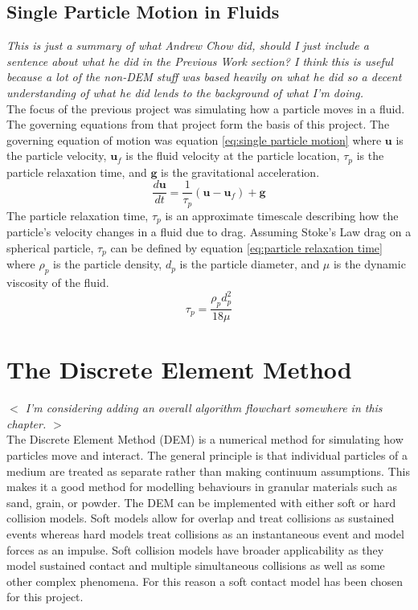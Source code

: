 \documentclass[10pt,a4paper,titlepage]{report}
\begin{document}
\section{Single Particle Motion in Fluids}
\label{sec:Single Particle Motion in Fluids}
\textit{This is just a summary of what Andrew Chow did, should I just include a sentence about what he did in the Previous Work section? I think this is useful because a lot of the non-DEM stuff was based heavily on what he did so a decent understanding of what he did lends to the background of what I'm doing.\\}
The focus of the previous project was simulating how a particle moves in a fluid. The governing equations from that project form the basis of this project. The governing equation of motion was equation \ref{eq:single particle motion} where $\mathbf{u}$ is the particle velocity, $\mathbf{u}_f$ is the fluid velocity at the particle location, $\tau_p$ is the particle relaxation time, and $\mathbf{g}$ is the gravitational acceleration.
\begin{equation}
\label{eq:single particle motion}
\dfrac{d\mathbf{u}}{dt} = \dfrac{1}{\tau_p}(\mathbf{u} - \mathbf{u}_f) + \mathbf{g}
\end{equation}
The particle relaxation time, $\tau_p$ is an approximate timescale describing how the particle's velocity changes in a fluid due to drag. Assuming Stoke's Law drag on a spherical particle, $\tau_p$ can be defined by equation \ref{eq:particle relaxation time} where $\rho_p$ is the particle density, $d_p$ is the particle diameter, and $\mu$ is the dynamic viscosity of the fluid.
\begin{equation}
\label{eq:particle relaxation time}
\tau_{p} = \dfrac{\rho_{p} d^{2}_{p}}{18 \mu}
\end{equation}
\chapter{The Discrete Element Method}
\label{ch:The Discrete Element Method}
\textit{$<$ I'm considering adding an overall algorithm flowchart somewhere in this chapter. $>$}
\\The Discrete Element Method (DEM) is a numerical method for simulating how particles move and interact. The general principle is that individual particles of a medium are treated as separate rather than making continuum assumptions. This makes it a good method for modelling behaviours in granular materials such as sand, grain, or powder. The DEM can be implemented with either soft or hard collision models. Soft models allow for overlap and treat collisions as sustained events whereas hard models treat collisions as an instantaneous event and model forces as an impulse. Soft collision models have broader applicability as they model sustained contact and multiple simultaneous collisions as well as some other complex phenomena\cite{softvshard}. For this reason a soft contact model has been chosen for this project.
\end{document}
